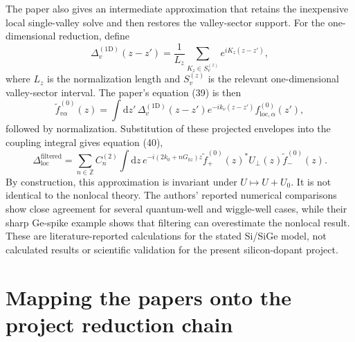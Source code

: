 The paper also gives an intermediate approximation that retains the inexpensive
local single-valley solve and then restores the valley-sector support. For the
one-dimensional reduction, define
\begin{equation}
  \Delta_v^{(1\mathrm D)}(z-z')
  =
  \frac{1}{L_z}\sum_{K_z\in S_v^{(z)}}e^{iK_z(z-z')},
  \label{eq:ermoneit-one-dimensional-projector}
\end{equation}
where $L_z$ is the normalization length and $S_v^{(z)}$ is the relevant
one-dimensional valley-sector interval. The paper's equation (39) is then
\begin{equation}
  \widetilde f_{v\alpha}^{(0)}(z)
  =
  \int \mathrm{d}z'\,
  \Delta_v^{(1\mathrm D)}(z-z')e^{-ik_v(z-z')}
  f_{\mathrm{loc},\alpha}^{(0)}(z'),
  \label{eq:ermoneit-filtered-envelope}
\end{equation}
followed by normalization. Substitution of these projected envelopes into the
coupling integral gives equation (40),
\begin{equation}
  \Delta_{\mathrm{loc}}^{\mathrm{filtered}}
  =
  \sum_{n\in\mathbb Z}C_n^{(2)}
  \int \mathrm{d}z\,
  e^{-i(2k_0+nG_{0z})z}
  \widetilde f_{+}^{(0)}(z)^{*}U_{\perp}(z)
  \widetilde f_{-}^{(0)}(z).
  \label{eq:ermoneit-filtered-coupling}
\end{equation}
By construction, this approximation is invariant under $U\mapsto U+U_0$.
It is not identical to the nonlocal theory. The authors' reported numerical
comparisons show close agreement for several quantum-well and wiggle-well cases,
while their sharp Ge-spike example shows that filtering can overestimate the
nonlocal result. These are literature-reported calculations for the stated
Si/SiGe model, not calculated results or scientific validation for the present
silicon-dopant project.

\section{Mapping the papers onto the project reduction chain}


